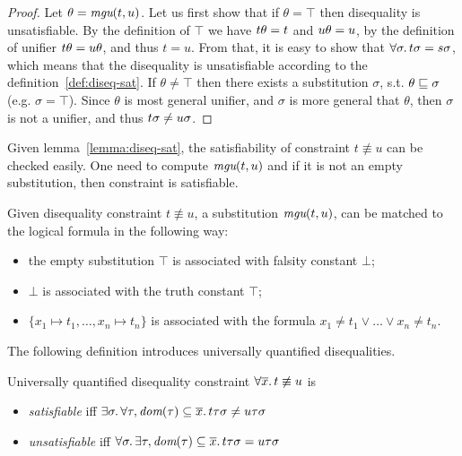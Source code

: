\begin{proof}
  Let $\theta = \textit{mgu}(t, u)$.
  Let us first show that if $\theta = \top$ 
  then disequality is unsatisfiable.
  By the definition of $\top$ we have 
  ${t}{\theta} = t$ and ${u}{\theta} = u$,
  by the definition of unifier 
  ${t}{\theta} = {u}{\theta}$, 
  and thus $t = u$.
  From that, it is easy to show that 
  $\forall \sigma\ldotp {t}{\sigma} = {s}{\sigma}$,
  which means that the disequality is unsatisfiable according to 
  the definition~\ref{def:diseq-sat}.
  If $\theta \neq \top$ then 
  there exists a substitution $\sigma$,
  s.t. $\theta \sqsubseteq \sigma$ (e.g. $\sigma = \top$).
  Since $\theta$ is most general unifier, 
  and $\sigma$ is more general that $\theta$,
  then $\sigma$ is not a unifier,
  and thus ${t}{\sigma} \neq {u}{\sigma}$.
\end{proof}

Given lemma~\ref{lemma:diseq-sat}, the satisfiability of
constraint $t \not\equiv u$ can be checked easily.
One need to compute $\textit{mgu}(t, u)$
and if it is not an empty substitution,
then constraint is satisfiable.

\begin{remark}
  Given disequality constraint $t \not\equiv u$,
  a substitution $\textit{mgu}(t, u)$,
  can be matched to the logical formula in the following way:
  \begin{itemize}
    \item the empty substitution $\top$ is associated with falsity constant $\bot$;
    \item $\bot$ is associated with the truth constant $\top$;
    \item $\{x_1 \mapsto t_1, \dots, x_n \mapsto t_n\}$ is associated with 
          the formula $x_1 \neq t_1 \vee \dots \vee x_n \neq t_n$.
  \end{itemize}
\end{remark}


The following definition introduces universally quantified disequalities.

\begin{definition}
  Universally quantified disequality constraint 
  $\forall \overline{x}\ldotp t \not\equiv u$ is
  \begin{itemize}
    \item \emph{satisfiable} iff
          ${\exists \sigma\ldotp 
            \forall \tau, \textit{dom}{({\tau})} \subseteq \overline{x}\ldotp 
            {{t}{\tau}}{\sigma} \neq {{u}{\tau}}{\sigma}
          }$
    \item \emph{unsatisfiable} iff
          ${\forall \sigma\ldotp 
            \exists \tau, \textit{dom}{({\tau})} \subseteq \overline{x}\ldotp 
            {{t}{\tau}}{\sigma} = {{u}{\tau}}{\sigma}
          }$
  \end{itemize}
\end{definition}

